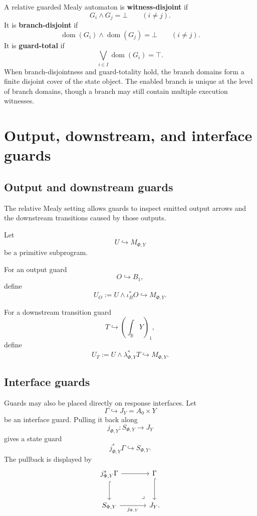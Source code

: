 A relative guarded Mealy automaton is \textbf{witness-disjoint} if
\[
G_i\wedge G_j=\bot
\qquad
(i\ne j).
\]
It is \textbf{branch-disjoint} if
\[
\operatorname{dom}(G_i)\wedge\operatorname{dom}(G_j)=\bot
\qquad
(i\ne j).
\]
It is \textbf{guard-total} if
\[
\bigvee_{i\in I}\operatorname{dom}(G_i)=\top.
\]
When branch-disjointness and guard-totality hold, the branch domains form a
finite disjoint cover of the state object.  The enabled branch is unique at
the level of branch domains, though a branch may still contain multiple
execution witnesses.

\section{Output, downstream, and interface guards}
\label{sec:poly-relative-output-downstream-interface-guards}

\subsection{Output and downstream guards}
\label{subsec:poly-relative-output-downstream-guards}

The relative Mealy setting allows guards to inspect emitted output arrows and
the downstream transitions caused by those outputs.

Let
\[
U\hookrightarrow M_{\Phi,Y}
\]
be a primitive subprogram.

For an output guard
\[
O\hookrightarrow B_1,
\]
define
\[
U_O:=U\wedge\iota_B^\ast O\hookrightarrow M_{\Phi,Y}.
\]

For a downstream transition guard
\[
T\hookrightarrow\left(\int_{\mathbb B}Y\right)_1,
\]
define
\[
U_T:=U\wedge\lambda_{\Phi,Y}^\ast T\hookrightarrow M_{\Phi,Y}.
\]

\subsection{Interface guards}
\label{subsec:poly-relative-interface-guards}

Guards may also be placed directly on response interfaces.  Let
\[
\Gamma\hookrightarrow J_Y=A_0\times Y
\]
be an interface guard.  Pulling it back along
\[
j_{\Phi,Y}:S_{\Phi,Y}\to J_Y
\]
gives a state guard
\[
j_{\Phi,Y}^\ast\Gamma\hookrightarrow S_{\Phi,Y}.
\]
The pullback is displayed by
\[
\begin{tikzcd}[column sep=large,row sep=large]
j_{\Phi,Y}^\ast\Gamma
  \arrow[r]
  \arrow[d,hook]
&
\Gamma
  \arrow[d,hook]
\\
S_{\Phi,Y}
  \arrow[r,"j_{\Phi,Y}"']
&
J_Y
\arrow[ul,phantom,very near start,"\lrcorner"] .
\end{tikzcd}
\]

